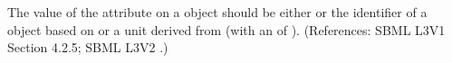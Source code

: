 The value of the attribute  on a \Model object should be
either  or the identifier of a \UnitDefinition object
based on  or a unit derived from  (with an
 of ).  (References: SBML L3V1 Section 4.2.5; SBML L3V2
.)
